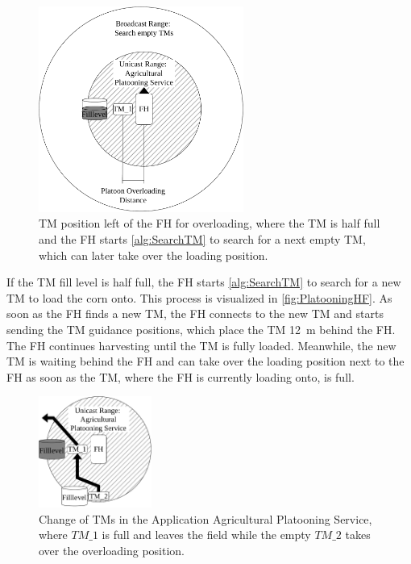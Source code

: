 \begin{figure}[]%
	\centering
	\includegraphics[width=0.6\textwidth]{figures/platoonHALF}
	\caption{\acf{TM} position left of the \acf{FH} for overloading, where the \ac{TM} is half full and the
		\ac{FH} starts \autoref{alg:SearchTM} to search for a next empty \ac{TM},
		which can later take over the loading position.}
	\label{fig:PlatooningHF}%
\end{figure}
If the \ac{TM} fill level is half full, the \ac{FH} starts \autoref{alg:SearchTM}
to search for a new \ac{TM} to load the corn onto.
This process is visualized in \autoref{fig:PlatooningHF}.
As soon as the \ac{FH} finds a new \ac{TM}, the \ac{FH} connects to the new \ac{TM} and starts sending
the \ac{TM} guidance positions, which place the \ac{TM} \SI{12}{\metre} behind the \ac{FH}.
The \ac{FH} continues harvesting until the \ac{TM} is fully loaded.
Meanwhile, the new \ac{TM} is waiting behind the \ac{FH} and can take over the loading position next to the \ac{FH} as
soon as the \ac{TM}, where the \ac{FH} is currently loading onto, is full.

\begin{figure}[]%
	\centering
	\includegraphics[width=0.33\textwidth]{figures/platoonFULL}
	\caption{Change of \acf{TM}s in the Application Agricultural Platooning Service, where $TM\_1$
	is full and leaves the field while the empty $TM\_2$ takes over the overloading position.}
	\label{fig:PlatooningFull}%
\end{figure}

